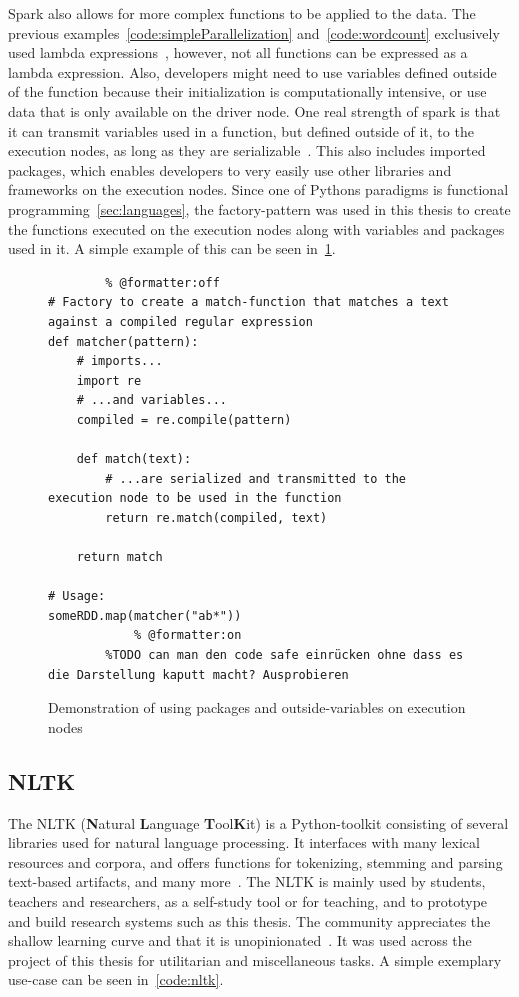 Spark also allows for more complex functions to be applied to the data.
The previous examples~\ref{code:simpleParallelization} and~\ref{code:wordcount} exclusively used lambda expressions~\cite{pythonDocs},
however, not all functions can be expressed as a lambda expression.
Also, developers might need to use variables defined outside of the function because their initialization is computationally intensive,
or use data that is only available on the driver node.
One real strength of spark is that it can transmit variables used in a function, but defined outside of it, to the execution nodes, as long as they are serializable~\cite{sparkDocs}.
This also includes imported packages, which enables developers to very easily use other libraries and frameworks on the execution nodes.
Since one of Pythons paradigms is functional programming~\ref{sec:languages},
the factory-pattern was used in this thesis to create the functions executed on the execution nodes along with variables and packages used in it.
A simple example of this can be seen in~\ref{code:factory}.

\begin{figure}
    \caption{Demonstration of using packages and outside-variables on execution nodes}
    \label{code:factory}
    \begin{verbatim}
        % @formatter:off
# Factory to create a match-function that matches a text against a compiled regular expression
def matcher(pattern):
    # imports...
    import re
    # ...and variables...
    compiled = re.compile(pattern)

    def match(text):
        # ...are serialized and transmitted to the execution node to be used in the function
        return re.match(compiled, text)

    return match

# Usage:
someRDD.map(matcher("ab*"))
            % @formatter:on
        %TODO can man den code safe einrücken ohne dass es die Darstellung kaputt macht? Ausprobieren
    \end{verbatim}
\end{figure}

\subsection{NLTK}
\label{subsec:nltk}

The NLTK (\textbf{N}atural \textbf{L}anguage \textbf{T}ool\textbf{K}it) is a Python-toolkit consisting of several libraries used for
natural language processing.
It interfaces with many lexical resources and corpora, and offers functions for tokenizing, stemming and parsing text-based artifacts,
and many more~\cite{nltkDocs}.
The NLTK is mainly used by students, teachers and researchers, as a self-study tool or for teaching,
and to prototype and build research systems such as this thesis.
The community appreciates the shallow learning curve and that it is unopinionated~\cite{Bird2006}.
It was used across the project of this thesis for utilitarian and miscellaneous tasks.
A simple exemplary use-case can be seen in~\ref{code:nltk}.

